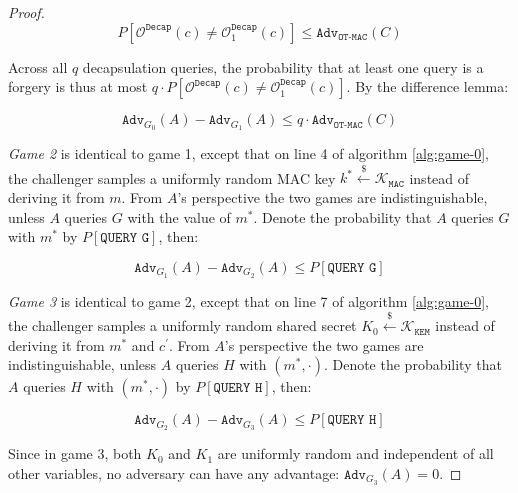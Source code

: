 \documentclass[floatrow,journal=tches,submission]{iacrtrans}
\newcommand{\kem}{\texttt{KEM}}
\newcommand{\decap}{\texttt{Decap}}
\newcommand{\mac}{\texttt{MAC}}
\newcommand{\leftsample}{\stackrel{\$}{\leftarrow}}
\newcommand{\adv}{\texttt{Adv}}
\begin{document}
\begin{proof}
    \begin{equation*}
        P\left[\mathcal{O}^\decap(c) \neq \mathcal{O}^\decap_1(c)\right]
        \leq \adv_\texttt{OT-MAC}(C)
    \end{equation*}

    Across all $q$ decapsulation queries, the probability that at least one query is a forgery is thus at most $q \cdot P\left[\mathcal{O}^\decap(c) \neq \mathcal{O}^\decap_1(c)\right]$. By the difference lemma:

    \begin{equation*}
        \adv_{G_0}(A) - \adv_{G_1}(A) \leq q\cdot  \adv_\texttt{OT-MAC}(C)
    \end{equation*}

    \emph{Game 2} is identical to game 1, except that on line 4 of algorithm \ref{alg:game-0}, the challenger samples a uniformly random MAC key $k^\ast \leftsample \mathcal{K}_\mac$ instead of deriving it from $m$. From $A$'s perspective the two games are indistinguishable, unless $A$ queries $G$ with the value of $m^\ast$. Denote the probability that $A$ queries $G$ with $m^\ast$ by $P[\texttt{QUERY G}]$, then:

    \begin{equation*}
        \adv_{G_1}(A) - \adv_{G_2}(A) \leq P\left[\texttt{QUERY G}\right]
    \end{equation*}

    \emph{Game 3} is identical to game 2, except that on line 7 of algorithm \ref{alg:game-0}, the challenger samples a uniformly random shared secret $K_0 \leftsample \mathcal{K}_\kem$ instead of deriving it from $m^\ast$ and $c^\prime$. From $A$'s perspective the two games are indistinguishable, unless $A$ queries $H$ with $(m^\ast, \cdot)$. Denote the probability that $A$ queries $H$ with $(m^\ast, \cdot)$ by $P[\texttt{QUERY H}]$, then:

    \begin{equation*}
        \adv_{G_2}(A) - \adv_{G_3}(A) \leq P\left[\texttt{QUERY H}\right]
    \end{equation*}

    Since in game 3, both $K_0$ and $K_1$ are uniformly random and independent of all other variables, no adversary can have any advantage: $\adv_{G_3}(A) = 0$.


\end{proof}
\end{document}
